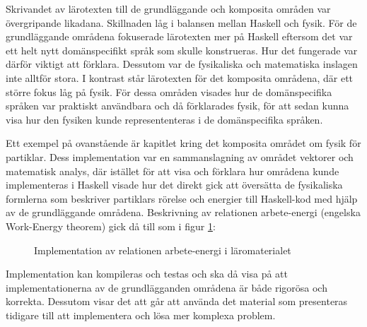\begin{draft}
Skrivandet av lärotexten till de grundläggande och komposita områden var
övergripande likadana. Skillnaden låg i balansen mellan Haskell och fysik. För
de grundläggande områdena fokuserade lärotexten mer på Haskell eftersom det var
ett helt nytt domänspecifikt språk som skulle konstrueras. Hur det fungerade var
därför viktigt att förklara. Dessutom var de fysikaliska och matematiska
inslagen inte alltför stora. I kontrast står lärotexten för det komposita
områdena, där ett större fokus låg på fysik. För dessa områden visades hur de
domänspecifika språken var praktiskt användbara och då förklarades fysik, för
att sedan kunna visa hur den fysiken kunde represententeras i de domänspecifika
språken.

Ett exempel på ovanstående är kapitlet kring det komposita området om fysik för
partiklar. Dess implementation var en sammanslagning av området vektorer och
matematisk analys, där istället för att visa och förklara hur områdena kunde
implementeras i Haskell visade hur det direkt gick att översätta de
fysikaliska formlerna som beskriver partiklars rörelse och energier till
Haskell-kod med hjälp av de grundläggande områdena. Beskrivning av relationen arbete-energi (engelska Work-Energy theorem) gick då till som i figur \ref{fig:komposit-ex}:

\begin{figure}[tph]
  \centering
  \caption{Implementation av relationen arbete-energi i läromaterialet}
  \label{fig:komposit-ex}
\end{figure}

Implementation kan kompileras och testas och ska då visa på att
implementationerna av de grundlägganden områdena är både rigorösa och korrekta.
Dessutom visar det att går att använda det material som presenteras tidigare
till  att implementera och lösa mer komplexa problem.

\end{draft}
